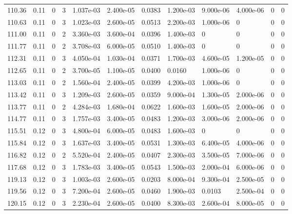 \documentclass[preview]{standalone}
\begin{document}
{{{{{{\begin{tabular}{L{1.2cm}C{1.2cm} C{0.3cm}C{0.5cm} C{1.4cm}C{1.4cm} C{1.4cm}C{1.4cm} C{1.6cm}C{1.6cm} C{1.6cm}C{1.6cm}}
  110.36  &  0.11  & 0     &  3 &  1.037e-03  & 2.400e-05  &  0.0383&   1.200e-03& 9.000e-06 & 4.000e-06   &  0 & 0  \\ 
  110.63  &  0.11  & 0     &  3 &  1.023e-03  & 2.600e-05  &  0.0513&   2.200e-03& 1.000e-06 & 0   &  0 & 0  \\ 
  111.00  &  0.11  & 0     &  2 &  3.360e-03  & 3.600e-04  &  0.0396&   1.400e-03& 0 & 0   &  0 & 0  \\ 
  111.77  &  0.11  & 0     &  2 &  3.708e-03  & 6.000e-05  &  0.0510&   1.400e-03& 0 & 0   &  0 & 0  \\ 
  112.31  &  0.11  & 0     &  3 &  4.050e-04  & 1.030e-04  &  0.0371&   1.700e-03& 4.600e-05 & 1.200e-05   &  0 & 0  \\ 
  112.65  &  0.11  & 0     &  2 &  3.700e-05  & 1.100e-05  &  0.0400&   0.0160& 1.000e-06 & 0   &  0 & 0  \\ 
  113.03  &  0.11  & 0     &  2 &  1.560e-04  & 2.400e-05  &  0.0399&   4.200e-03& 1.000e-06 & 0   &  0 & 0  \\ 
  113.42  &  0.11  & 0     &  3 &  1.209e-03  & 2.600e-05  &  0.0359&   9.000e-04& 1.300e-05 & 2.000e-06   &  0 & 0  \\ 
  113.77  &  0.11  & 0     &  2 &  4.284e-03  & 1.680e-04  &  0.0622&   1.600e-03& 1.600e-05 & 2.000e-06   &  0 & 0  \\ 
  114.77  &  0.11  & 0     &  3 &  1.757e-03  & 3.400e-05  &  0.0483&   1.200e-03& 3.000e-06 & 2.000e-06   &  0 & 0  \\ 
  115.51  &  0.12  & 0     &  3 &  4.800e-04  & 6.000e-05  &  0.0483&   1.600e-03& 0 & 0   &  0 & 0  \\ 
  115.84  &  0.12  & 0     &  3 &  1.637e-03  & 3.400e-05  &  0.0531&   1.300e-03& 6.400e-05 & 4.000e-06   &  0 & 0  \\ 
  116.82  &  0.12  & 0     &  2 &  5.520e-04  & 2.400e-05  &  0.0407&   2.300e-03& 3.500e-05 & 7.000e-06   &  0 & 0  \\ 
  117.68  &  0.12  & 0     &  3 &  1.783e-03  & 3.400e-05  &  0.0543&   1.500e-03& 2.000e-04 & 6.000e-06   &  0 & 0  \\ 
  119.13  &  0.12  & 0     &  3 &  1.003e-03  & 2.600e-05  &  0.0203&   8.000e-04& 9.300e-04 & 2.500e-05   &  0 & 0  \\ 
  119.56  &  0.12  & 0     &  3 &  7.200e-04  & 2.600e-05  &  0.0460&   1.900e-03& 0.0103 & 2.500e-04   &  0 & 0  \\ 
  120.15  &  0.12  & 0     &  3 &  2.230e-04  & 2.600e-05  &  0.0400&   8.300e-03& 2.600e-04 & 8.000e-05   &  0 & 0  \\ 

\end{tabular}}}}}}}
\end{document}
